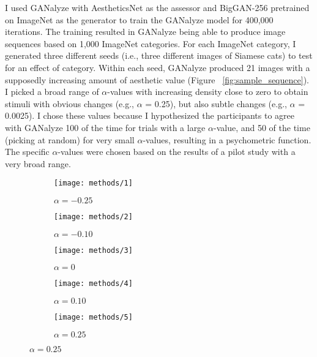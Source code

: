 \documentclass[../main.tex]{subfiles}
\begin{document}
	I used GANalyze with AestheticsNet \parencite{kongPhotoAestheticsRanking2016} as the assessor and BigGAN-256 \parencite{brockLargeScaleGAN2019} pretrained on ImageNet \parencite{russakovskyImageNetLargeScale2015} as the generator to train the GANalyze model for 400,000 iterations. The training resulted in GANalyze being able to produce image sequences based on 1,000 ImageNet categories. For each ImageNet category, I generated three different seeds (i.e., three different images of Siamese cats) to test for an effect of category. Within each seed, GANalyze produced 21 images with a supposedly increasing amount of aesthetic value (Figure ~\ref{fig:sample_sequence}). I picked a broad range of $\alpha$-values with increasing density close to zero to obtain stimuli with obvious changes (e.g., $\alpha$ = 0.25), but also subtle changes (e.g., $\alpha$ = 0.0025). I chose these values because I hypothesized the participants to agree with GANalyze 100 of the time for trials with a large $\alpha$-value, and 50 of the time (picking at random) for very small $\alpha$-values, resulting in a psychometric function. The specific $\alpha$-values were chosen based on the results of a pilot study with a very broad range.
	
	\begin{figure}[ht]
		\caption{Truncated Sample of an Image Sequence from One Seed Produced by GANalyze}
		\label{fig:sample_sequence}
		\centering
		\begin{subfigure}{.18\textwidth}
			\centering
			\texttt{[image: methods/1]}
			\caption{\centering $\alpha = -0.25$}
		\end{subfigure} \hfill
		\begin{subfigure}{.18\textwidth}
			\centering
			\texttt{[image: methods/2]}
			\caption{\centering $\alpha = -0.10$}
		\end{subfigure} \hfill
		\begin{subfigure}{.18\textwidth}
			\centering
			\texttt{[image: methods/3]}
			\caption{\centering $\alpha = 0$}
		\end{subfigure} \hfill
		\begin{subfigure}{.18\textwidth}
			\centering
			\texttt{[image: methods/4]}
			\caption{\centering $\alpha = 0.10$}
		\end{subfigure} \hfill
		\begin{subfigure}{.18\textwidth}
			\centering
			\texttt{[image: methods/5]}
			\caption{\centering $\alpha = 0.25$}
		\end{subfigure} \hfill
	\end{figure}
	
\end{document}
